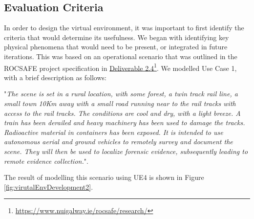 
\subsection{Evaluation Criteria}
In order to design the virtual environment, it was important to first identify the criteria that would determine its usefulness. We began with identifying key physical phenomena that would need to be present, or integrated in future iterations. This was based on an operational scenario that was outlined in the ROCSAFE project specification in \href{https://www.nuigalway.ie/rocsafe/research/}{Deliverable 2.4}\footnote{\href {https://www.nuigalway.ie/rocsafe/research/}{https://www.nuigalway.ie/rocsafe/research/}}. We modelled Use Case 1, with a brief description as follows:\par
"\textit{The scene is set in a rural location, with some forest, a twin track rail line, a small town 10Km away with a small road running near to the rail tracks with access to the rail tracks. The conditions are cool and dry, with a light breeze. A train has been derailed and heavy machinery has been used to damage the tracks. Radioactive material in containers has been exposed. It is intended to use autonomous aerial and ground vehicles to remotely survey and document the scene. They will then be used to localize forensic evidence, subsequently leading to remote evidence collection.}".\par
The result of modelling this scenario using UE4 is shown in Figure \ref{fig:virutalEnvDevelopment2}.


